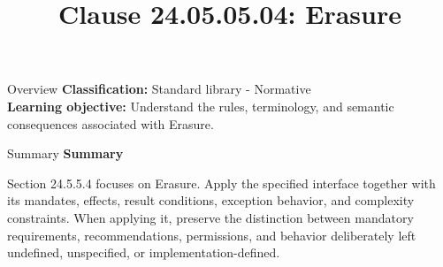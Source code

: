 \documentclass[10pt,letterpaper]{article}
\title{Clause 24.05.05.04: Erasure}
\author{}
\date{}
\begin{document}
\maketitle
\begin{CornellOverviewBox}{Overview}
\textbf{Classification:} Standard library - Normative\\[2pt]
\textbf{Learning objective:} Understand the rules, terminology, and semantic consequences associated with Erasure.
\end{CornellOverviewBox}\begin{CornellSummaryBox}{Summary}
{\sffamily\bfseries\color{Accent} Summary}\par\vspace{3pt}Section 24.5.5.4 focuses on Erasure. Apply the specified interface together with its mandates, effects, result conditions, exception behavior, and complexity constraints. When applying it, preserve the distinction between mandatory requirements, recommendations, permissions, and behavior deliberately left undefined, unspecified, or implementation-defined.
\end{CornellSummaryBox}
\end{document}
